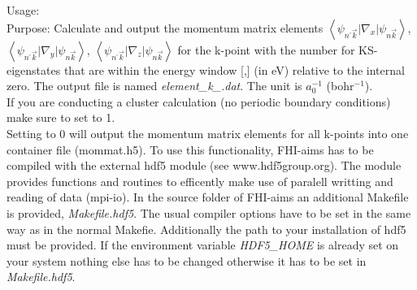 {
  \noindent
  Usage:    \\[1.0ex]
  Purpose: Calculate and output the momentum matrix elements $\left\langle\psi_{n^{'}\vec{k}}\vert\nabla_x\vert\psi_{n\vec{k}}\right\rangle$, 
  $\left\langle\psi_{n^{'}\vec{k}}\vert\nabla_y\vert\psi_{n\vec{k}}\right\rangle$, $\left\langle\psi_{n^{'}\vec{k}}\vert\nabla_z\vert\psi_{n\vec{k}}\right\rangle$
  for the k-point with the number  for KS-eigenstates that are within the energy window [,] (in eV) relative to the 
  internal zero. The output file is named \textit{element\_k\_}\textit{.dat}. The unit is $a_0^{-1}$ (bohr$^{-1}$).\\
  If you are conducting a cluster calculation (no periodic boundary conditions) make sure to set  to 1.\\
  Setting  to 0 will output the momentum matrix elements for all k-points into one container file (mommat.h5). To use this functionality, FHI-aims 
  has to be compiled with the external hdf5 module (see www.hdf5group.org). The module provides functions and routines to efficently make use of paralell 
  writting and reading of data (mpi-io). In the source folder of FHI-aims an additional Makefile is provided, \textit{Makefile.hdf5}. The usual compiler options have to 
  be set in the same way as in the normal Makefie. Additionally the path to your installation of hdf5 must be provided. If the environment variable \textit{HDF5\_HOME} is 
  already set on your system nothing else has to be changed otherwise it has to be set in \textit{Makefile.hdf5}.\\[1.0ex]
}
